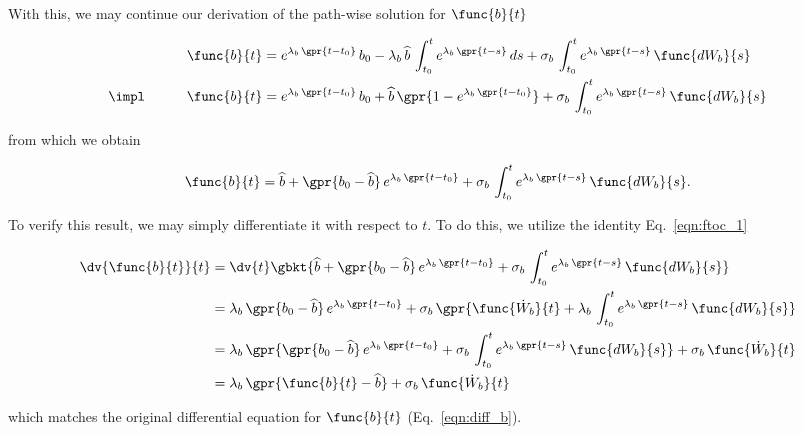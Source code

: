 With this, we may continue our derivation of the path-wise solution for $\func{b}{t}$

\begin{alignat*}{2}
    &	& \func{b}{t} &= e^{\lambda_{b}\,\gpr{t - t_0}}\,b_{0} - \lambda_{b}\,\widehat{b}\,\int_{t_{0}}^{t} e^{\lambda_b\,\gpr{t - s}}\,ds + \sigma_{b}\,\int_{t_{0}}^{t} e^{\lambda_b\,\gpr{t - s}}\,\func{d{W}_{b}}{s} \\
    &\impl\qquad	& \func{b}{t} &= e^{\lambda_{b}\,\gpr{t - t_0}}\,b_{0} + \widehat{b}\,\gpr{1 - e^{\lambda_b\,\gpr{t - t_0}}} + \sigma_{b}\,\int_{t_{0}}^{t} e^{\lambda_b\,\gpr{t - s}}\,\func{d{W}_{b}}{s} 
\end{alignat*}

from which we obtain

\begin{equation}
    \func{b}{t} = \widehat{b} + \gpr{b_0 - \widehat{b}}\,e^{\lambda_{b}\,\gpr{t - t_0}} + \sigma_{b}\,\int_{t_{0}}^{t} e^{\lambda_b\,\gpr{t - s}}\,\func{d{W}_{b}}{s}.
    \label{eqn:pathwise_b}
\end{equation}

To verify this result, we may simply differentiate it with respect to $t$. To do this, we utilize the identity Eq.~\ref{eqn:ftoc_1}

\begin{align*}
    \dv{\func{b}{t}}{t} &= \dv{t} \gbkt{\widehat{b} + \gpr{b_0 - \widehat{b}}\,e^{\lambda_{b}\,\gpr{t - t_0}} + \sigma_{b}\,\int_{t_{0}}^{t} e^{\lambda_b\,\gpr{t - s}}\,\func{d{W}_{b}}{s}} \\
     	&= \lambda_{b}\,\gpr{b_0 - \widehat{b}}\,e^{\lambda_{b}\,\gpr{t - t_0}} + \sigma_{b}\,\gpr{\func{\dot{W}_{b}}{t} + \lambda_b\,\int_{t_{0}}^{t} e^{\lambda_b\,\gpr{t - s}}\,\func{d{W}_{b}}{s}} \\
     	&= \lambda_{b}\,\gpr{\gpr{b_0 - \widehat{b}}\,e^{\lambda_{b}\,\gpr{t - t_0}} + \sigma_{b}\,\int_{t_{0}}^{t} e^{\lambda_b\,\gpr{t - s}}\,\func{d{W}_{b}}{s}} + \sigma_{b}\,\func{\dot{W}_{b}}{t} \\
     	&= \lambda_{b}\,\gpr{\func{b}{t} - \widehat{b}} + \sigma_{b}\,\func{\dot{W}_{b}}{t} 
\end{align*}

which matches the original differential equation for $\func{b}{t}$ (Eq.~\ref{eqn:diff_b}).